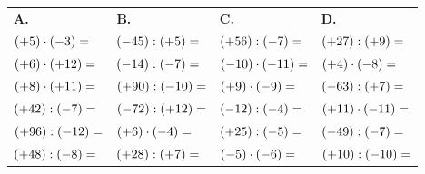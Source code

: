 \vfill
{}

{\small
\bigskip
\def\arraystretch{1.7}
\begin{tabularx}{\linewidth}{*{4}{X}}
\textbf{A.} & \textbf{B.} & \textbf{C.} & \textbf{D.} \\
$(+5)\cdot(-3)= \dotfill$    & $(-45):(+5)= \dotfill$  & $(+56):(-7)= \dotfill$      & $(+27):(+9)= \dotfill$      \\
$(+6)\cdot(+12)= \dotfill$   & $(-14):(-7)= \dotfill$  & $(-10)\cdot(-11)= \dotfill$ & $(+4)\cdot(-8)= \dotfill$   \\
$(+8)\cdot(+11)= \dotfill$   & $(+90):(-10)= \dotfill$ & $(+9)\cdot(-9)= \dotfill$   & $(-63):(+7)= \dotfill$      \\
$(+42):(-7)= \dotfill$       & $(-72):(+12)= \dotfill$ & $(-12):(-4)= \dotfill$      & $(+11)\cdot(-11)= \dotfill$ \\
$(+96):(-12)= \dotfill$      & $(+6)\cdot(-4)= \dotfill$ & $(+25):(-5)= \dotfill$    & $(-49):(-7)= \dotfill$      \\
$(+48):(-8)= \dotfill$       & $(+28):(+7)= \dotfill$  & $(-5)\cdot(-6)= \dotfill$   & $(+10):(-10)= \dotfill$     \\
\end{tabularx}
}

\newpage
{}

